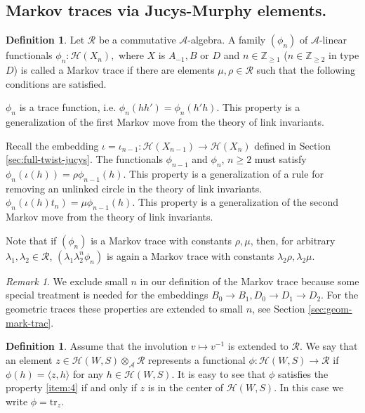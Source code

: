 \documentclass[11pt,leqno]{article}
\theoremstyle{definition}
\newtheorem{definition}[theorem]{Definition}%
\theoremstyle{definition}
\theoremstyle{remark}
\newtheorem{remark}[theorem]{Remark}%
\newcommand{\He}{\mathcal{H}}
\newcommand{\tr}{\mathrm{tr}}
\begin{document}
\subsection{Markov traces via Jucys-Murphy elements.}
\label{sec:markov-traces-via-1}
\begin{definition}
\label{sec:markov-traces}  
Let $\mathcal{R}$ be a commutative $\mathcal{A}$-algebra. A family $(\phi_n)$ of $\mathcal{A}$-linear functionals $\phi_n: \He(X_n),$ where $X$ is $A_{-1}, B$ or $D$ and $n \in \mathbb{Z}_{\geq 1}$ ($n \in \mathbb{Z}_{\geq 2}$ in type $D$) is called a Markov trace if there are elements $\mu, \rho \in \mathcal{R}$ such that the following conditions are satisfied.
\begin{enumerate}
\label{item:4} $\phi_n$ is a trace function, i.e. $\phi_n(hh') = \phi_n(h'h)$. This property is a generalization of the first Markov move from the theory of link invariants. 

  Recall the embedding $ \iota = \iota_{n-1}:\He(X_{n-1}) \to \He(X_n)$ defined in Section \ref{sec:full-twist-jucys}. The functionals $\phi_{n-1}$ and $\phi_n$, $n \geq 2$ must satisfy 
\label{item:5} 
  \(   \phi_n(\iota(h)) = \rho \phi_{n-1}(h). \) This property is a generalization of a rule for removing an unlinked circle in the theory of link invariants.
\label{item:6} 
  \(   \phi_n(\iota(h)t_n) = \mu \phi_{n-1}(h). \)
This property is a generalization of the second Markov move from the theory of link invariants.
\end{enumerate}

Note that if $(\phi_n)$ is a Markov trace with constants $\rho, \mu$,  then, for arbitrary $\lambda_1, \lambda_2 \in \mathcal{R}$, $(\lambda_1\lambda_2^n\phi_n)$ is again a Markov trace with constants $\lambda_2\rho, \lambda_2\mu$.

\begin{remark}
  We exclude small $n$ in our definition of the Markov trace because some special treatment is needed for the embeddings $B_0 \to B_1, D_0 \to D_1 \to D_2$. For the geometric traces these properties are extended to small $n$, see Section \ref{sec:geom-mark-trac}.
\end{remark}



\end{definition}
\begin{definition}
  Assume that the involution $v \mapsto v^{-1}$ is extended to $\mathcal{R}$. We say that an element $z \in \He(W,S) \otimes_\mathcal{A}\mathcal{R}$ represents a functional $\phi:\He(W,S) \to \mathcal{R}$ if $\phi(h) = \langle z, h\rangle$ for any $h \in \He(W,S)$. It is easy to see that $\phi$ satisfies the property \ref{item:4} if and only if $z$ is in the center of $\He(W,S)$. In this case we write $\phi = \tr_z$.
\end{definition}
\end{document}
